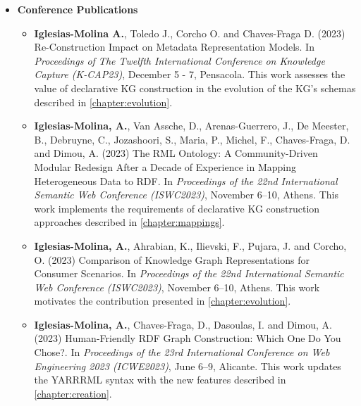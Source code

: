 \begin{itemize}
    \item \textbf{Conference Publications}
    \begin{itemize}
        \item \textbf{Iglesias-Molina A.}, Toledo J., Corcho O. and Chaves-Fraga D. (2023) Re-Construction Impact on Metadata Representation Models. In \textit{Proceedings of The Twelfth International Conference on Knowledge Capture (K-CAP23)}, December 5 - 7, Pensacola. This work assesses the value of declarative KG construction in the evolution of the KG's schemas described in \cref{chapter:evolution}.
    
        \item \textbf{Iglesias-Molina, A.}, Van Assche, D., Arenas-Guerrero, J., De Meester, B., Debruyne, C., Jozashoori, S., Maria, P., Michel, F., Chaves-Fraga, D. and Dimou, A. (2023) The RML Ontology: A Community-Driven Modular Redesign After a Decade of Experience in Mapping Heterogeneous Data to RDF. In \textit{Proceedings of the 22nd International Semantic Web Conference (ISWC2023)}, November 6--10, Athens. This work implements the requirements of declarative KG construction approaches described in \cref{chapter:mappings}. 
    
        \item \textbf{Iglesias-Molina, A.}, Ahrabian, K., Ilievski, F., Pujara, J. and Corcho, O. (2023) Comparison of Knowledge Graph Representations for Consumer Scenarios. In \textit{Proceedings of the 22nd International Semantic Web Conference (ISWC2023)}, November 6--10, Athens. This work motivates the contribution presented in \cref{chapter:evolution}.
    
        \item \textbf{Iglesias-Molina, A.}, Chaves-Fraga, D., Dasoulas, I. and Dimou, A. (2023) Human-Friendly RDF Graph Construction: Which One Do You Chose?. In \textit{Proceedings of the 23rd International Conference on Web Engineering 2023 (ICWE2023)}, June 6--9, Alicante. This work updates the YARRRML syntax with the new features described in \cref{chapter:creation}.
    \end{itemize}
\end{itemize}

